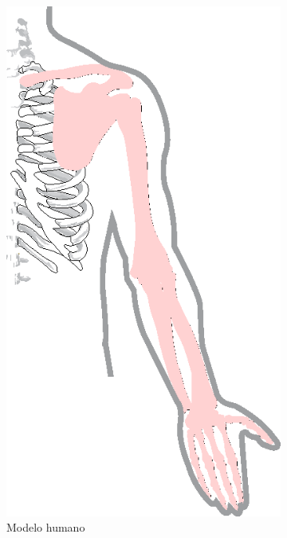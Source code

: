 \begin{figure}[!ht]
     \centering
     \begin{subfigure}[b]{0.31\textwidth}
         \centering
         \includegraphics[width=\textwidth]{chapters/cap-normas/brazo1.eps}
         \caption{Modelo humano}
         \label{fig:modelobrazo1}
     \end{subfigure}
     \hfill
     \begin{subfigure}[b]{0.31\textwidth}

\end{subfigure}
\end{figure}
